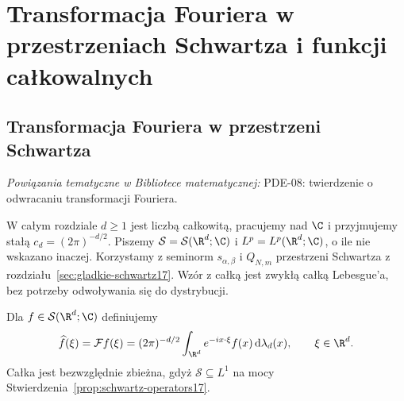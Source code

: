 \section{Transformacja Fouriera w przestrzeniach Schwartza i funkcji całkowalnych}
\providecommand{\atlasref}[2]{#2}

\subsection{Transformacja Fouriera w przestrzeni Schwartza}

\noindent\emph{Powiązania tematyczne w Bibliotece matematycznej:} \atlasref{PDE-08::thm:pde8-inversion}{PDE-08: twierdzenie o odwracaniu transformacji Fouriera}.


W całym rozdziale $d\ge1$ jest liczbą całkowitą,
pracujemy nad $\C$ i przyjmujemy stałą
$c_d=(2\pi)^{-d/2}$. Piszemy
$\mathcal S=\mathcal S(\R^d;\C)$ i
$L^p=L^p(\R^d;\C)$, o ile nie wskazano inaczej.
Korzystamy z seminorm $s_{\alpha,\beta}$ i $Q_{N,m}$
przestrzeni Schwartza z rozdziału~\ref{sec:gladkie-schwartz17}.
Wzór z całką jest zwykłą całką Lebesgue'a,
bez potrzeby odwoływania się do dystrybucji.

\begin{definicja}
\label{def:fourier-schwartz17}
Dla $f\in\mathcal S(\R^d;\C)$ definiujemy
\[
\widehat f(\xi)=\mathcal Ff(\xi)=
(2\pi)^{-d/2}\int_{\R^d}e^{-ix\cdot\xi}f(x)\,
\mathrm d\lambda_d(x),\qquad\xi\in\R^d.
\]
Całka jest bezwzględnie zbieżna, gdyż $\mathcal S\subseteq L^1$
na mocy Stwierdzenia~\ref{prop:schwartz-operators17}.
\end{definicja}

